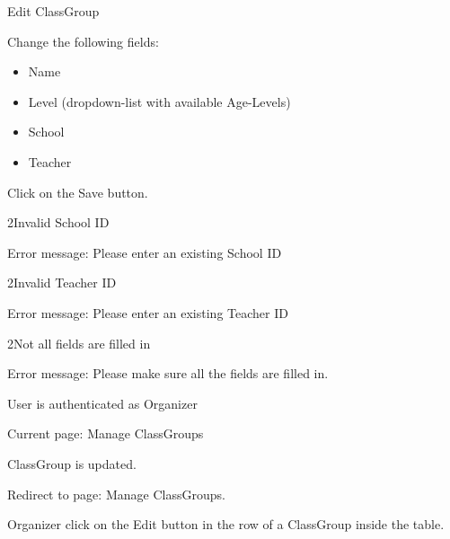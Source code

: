 
\begin{uc}{Edit ClassGroup}


    \begin{uc-mss}
    \item Change the following fields:
        \begin{itemize}
            \item Name
            \item Level (dropdown-list with available Age-Levels)
            \item School
            \item Teacher
        \end{itemize}
    \item Click on the Save button.
    \end{uc-mss}

    \begin{uc-ext}

        \begin{uc-fail}{2}{Invalid School ID}
        \item Error message: Please enter an existing School ID
        \end{uc-fail}

        \begin{uc-fail}{2}{Invalid Teacher ID}
        \item Error message: Please enter an existing Teacher ID
        \end{uc-fail}

        \begin{uc-fail}{2}{Not all fields are filled in}
        \item Error message: Please make sure all the fields are filled in.
        \end{uc-fail}

    \end{uc-ext}

    \begin{uc-pre}
    \item User is authenticated as Organizer
    \item Current page: Manage ClassGroups
    \end{uc-pre}

    \begin{uc-post}
    \item ClassGroup is updated.
    \item Redirect to page: Manage ClassGroups.
    \end{uc-post}

    \begin{uc-trig}
        Organizer click on the Edit button in the row of a ClassGroup inside the table.
    \end{uc-trig}

\end{uc}
